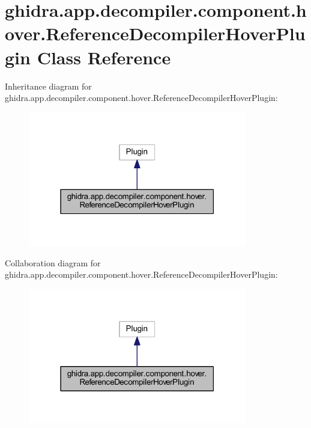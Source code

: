 \hypertarget{classghidra_1_1app_1_1decompiler_1_1component_1_1hover_1_1_reference_decompiler_hover_plugin}{}\section{ghidra.\+app.\+decompiler.\+component.\+hover.\+Reference\+Decompiler\+Hover\+Plugin Class Reference}
\label{classghidra_1_1app_1_1decompiler_1_1component_1_1hover_1_1_reference_decompiler_hover_plugin}


Inheritance diagram for ghidra.\+app.\+decompiler.\+component.\+hover.\+Reference\+Decompiler\+Hover\+Plugin\+:
\nopagebreak
\begin{figure}[H]
\begin{center}
\leavevmode
\includegraphics[width=271pt]{classghidra_1_1app_1_1decompiler_1_1component_1_1hover_1_1_reference_decompiler_hover_plugin__inherit__graph}
\end{center}
\end{figure}


Collaboration diagram for ghidra.\+app.\+decompiler.\+component.\+hover.\+Reference\+Decompiler\+Hover\+Plugin\+:
\nopagebreak
\begin{figure}[H]
\begin{center}
\leavevmode
\includegraphics[width=271pt]{classghidra_1_1app_1_1decompiler_1_1component_1_1hover_1_1_reference_decompiler_hover_plugin__coll__graph}
\end{center}
\end{figure}
